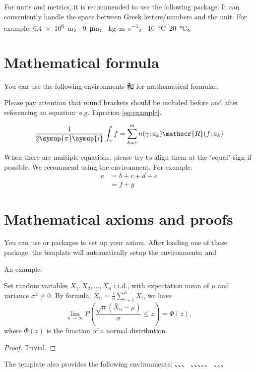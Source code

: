 For units and metrics, it is recommended to use the following package:
\href{http://mirrors.ctan.org/macros/latex/contrib/siunitx/siunitx.pdf}{}
It can conveniently handle the space between Greek letters/numbers and the unit. For example:
\SI{6.4e6}{m}，
\SI{9}{\micro\meter}，
\si{kg.m.s^{-1}}，
\SIrange{10}{20}{\degreeCelsius}。



\section{Mathematical formula}

You can use the following environments  和  for mathematical formulae.

Please pay attention that round brackets should be included before and after referencing an equation: e.g. Equation \eqref{eq:example}.

\begin{equation}
  \frac{1}{2 \symup{\pi} \symup{i}} \int_\gamma f = \sum_{k=1}^m n(\gamma; a_k) \mathscr{R}(f; a_k)
  \label{eq:example}
\end{equation}

When there are multiple equations, please try to align them at the "equal" sign if possible. We recommend using the  environment.
For example:
\begin{align}
  a & = b + c + d + e \\
    & = f + g
\end{align}


\section{Mathematical axioms and proofs}

You can use  or  packages to set up your axiom. After loading one of those package, the template will automatically setup the environments:  and 

An example:
\begin{theorem}
  Set random variables $X_1, X_2, \dots, X_n$ i.i.d., with expectation mean of $\mu$ and variance $\sigma^2 \ne 0$. By formula, $\bar{X}_n = \frac{1}{n} \sum_{i+1}^n X_i$, we have
  \begin{equation}
    \lim_{n \to \infty} P \left(\frac{\sqrt{n} \left( \bar{X}_n - \mu \right)}{\sigma} \le z \right) = \Phi(z),
  \end{equation}
  where $\Phi(z)$ is the function of a normal distribution.
\end{theorem}
\begin{proof}
  Trivial.
\end{proof}

The template also provides the following environments: 、、、
、、、、、
、、、 